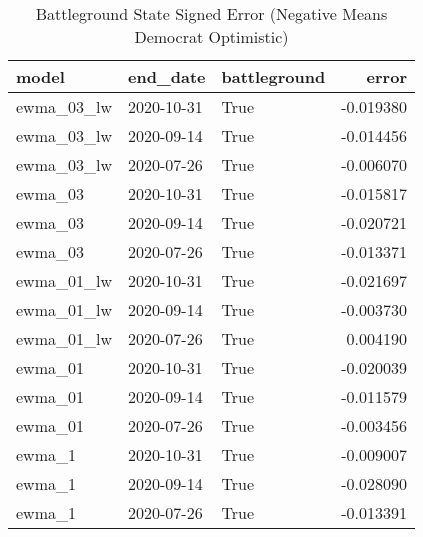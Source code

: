 \begin{table}
\centering
\caption{Battleground State Signed Error
(Negative Means Democrat Optimistic)}
\begin{tabular}{lllr}
\toprule
      model &    end\_date &  battleground &     error \\
\midrule
 ewma\_03\_lw &  2020-10-31 &          True & -0.019380 \\
 ewma\_03\_lw &  2020-09-14 &          True & -0.014456 \\
 ewma\_03\_lw &  2020-07-26 &          True & -0.006070 \\
    ewma\_03 &  2020-10-31 &          True & -0.015817 \\
    ewma\_03 &  2020-09-14 &          True & -0.020721 \\
    ewma\_03 &  2020-07-26 &          True & -0.013371 \\
 ewma\_01\_lw &  2020-10-31 &          True & -0.021697 \\
 ewma\_01\_lw &  2020-09-14 &          True & -0.003730 \\
 ewma\_01\_lw &  2020-07-26 &          True &  0.004190 \\
    ewma\_01 &  2020-10-31 &          True & -0.020039 \\
    ewma\_01 &  2020-09-14 &          True & -0.011579 \\
    ewma\_01 &  2020-07-26 &          True & -0.003456 \\
     ewma\_1 &  2020-10-31 &          True & -0.009007 \\
     ewma\_1 &  2020-09-14 &          True & -0.028090 \\
     ewma\_1 &  2020-07-26 &          True & -0.013391 \\
\bottomrule
\end{tabular}
\end{table}
